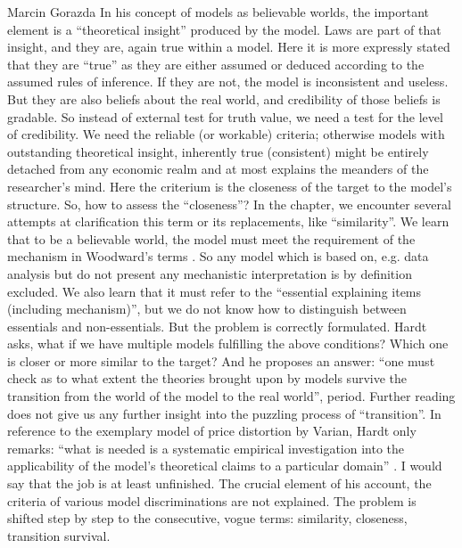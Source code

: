 \begin{recengenv}{Marcin Gorazda}
In his concept of models as believable worlds, the important element is a ``theoretical insight'' produced by the model.
Laws are part of that insight, and they are, again true within a model. Here it is more expressly stated that they are
``true'' as they are either assumed or deduced according to the assumed rules of inference. If they are not, the model is
inconsistent and useless. But they are also beliefs about the real world, and credibility of those beliefs is gradable.
So instead of external test for truth value, we need a test for the level of credibility. We need the reliable (or
workable) criteria; otherwise models with outstanding theoretical insight, inherently true (consistent) might be
entirely detached from any economic realm and at most explains the meanders of the researcher’s mind. Here the
criterium is the closeness of the target to the model’s structure. So, how to assess the ``closeness''? In the chapter,
we encounter several attempts at clarification this term or its replacements, like ``similarity''. We learn that to be a
believable world, the model must meet the requirement of the mechanism in Woodward’s terms
\parencite{woodward_what_2002}.
So any model which is based on, e.g. data analysis but do not present any
mechanistic interpretation is by definition excluded. We also learn that it must refer to the ``essential explaining
items (including mechanism)'', but we do not know how to distinguish between essentials and non-essentials. But the
problem is correctly formulated. Hardt asks, what if we have multiple models fulfilling the above conditions? Which one
is closer or more similar to the target? And he proposes an answer: ``\mydots one must check as to what extent the theories
brought upon by models survive the transition from the world of the model to the real world'', period. Further reading
does not give us any further insight into the puzzling process of ``transition''. In reference to the exemplary model of
price distortion by Varian, Hardt only remarks: ``\mydots what is needed is a systematic empirical investigation into the
applicability of the model’s theoretical claims to a particular domain''
\parencite[p.154]{hardt_economics_2017}.
I would say that the job is at least unfinished. The crucial element of his account, the criteria of various model
discriminations are not explained. The problem is shifted step by step to the consecutive, vogue terms: similarity,
closeness, transition survival. 


\end{recengenv}
